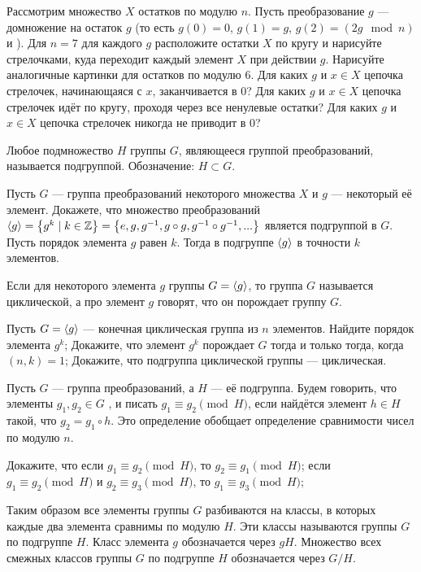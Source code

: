 \documentclass[a4paper,12pt]{article}
\begin{document}
Рассмотрим множество $X$ остатков по модулю $n$.
Пусть преобразование $g$ --- домножение на остаток $g$ (то есть $g(0) = 0$, $g(1) = g$, $g(2) = (2g\mod n)$ и ).
Для $n=7$ для каждого $g$ расположите остатки $X$ по кругу и нарисуйте стрелочками, куда переходит каждый элемент $X$ при действии $g$.
Нарисуйте аналогичные картинки для остатков по модулю $6$.
Для каких $g$ и $x\in X$ цепочка стрелочек, начинающаяся с $x$, заканчивается в $0$?
Для каких $g$ и $x\in X$ цепочка стрелочек идёт по кругу, проходя через все ненулевые остатки?
Для каких $g$ и $x\in X$ цепочка стрелочек никогда не приводит в 0?


Любое подмножество $H$ группы $G$, являющееся группой преобразований, называется подгруппой.
Обозначение: $H\subset G$.

Пусть $G$ --- группа преобразований некоторого множества $X$ и $g$ --- некоторый её элемент.
Докажете, что множество преобразований
$\left\langle g\right\rangle = \left\{g^k\mid k\in\mathbb{Z}\right\} = \left\{e, g, g^{-1}, g\circ g, g^{-1}\circ g^{-1}, ...\right\}$
является подгруппой в $G$.
\\
Пусть порядок элемента $g$ равен $k$.
Тогда в подгруппе $\left\langle g\right\rangle$ в точности $k$ элементов.

Если для некоторого элемента $g$ группы $G=\left\langle g\right\rangle$, то группа $G$ называется  циклической,
а про элемент $g$ говорят, что он  порождает группу $G$.


Пусть $G=\left\langle g\right\rangle$ --- конечная циклическая группа из $n$ элементов.
Найдите порядок элемента $g^k$;
Докажите, что элемент $g^k$ порождает $G$ тогда и только тогда, когда $(n,k)=1$;
Докажите, что подгруппа циклической группы --- циклическая.

Пусть $G$ --- группа преобразований, а $H$ --- её подгруппа.
Будем говорить, что элементы $g_1, g_2\in G$ ,
и писать $g_1\equiv g_2\pmod{H}$, если найдётся элемент $h\in H$ такой, что $g_2=g_1\circ h$.
Это определение обобщает определение сравнимости чисел по модулю $n$.

Докажите, что
если $g_1\equiv g_2\pmod{H}$, то $g_2\equiv g_1\pmod{H}$;
если $g_1\equiv g_2\pmod{H}$ и $g_2\equiv g_3\pmod{H}$,  то $g_1\equiv g_3\pmod{H}$;

Таким образом все элементы группы $G$ разбиваются на классы, в которых каждые два элемента сравнимы по модулю $H$.
Эти классы называются  группы $G$ по подгруппе $H$.
Класс элемента $g$ обозначается через $gH$.
Множество всех смежных классов группы $G$ по подгруппе $H$ обозначается через $G/H$.
\end{document}
